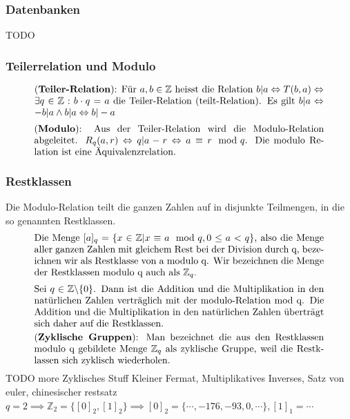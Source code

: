 \subsubsection{Datenbanken}
TODO

\subsubsection{Teilerrelation und Modulo}
\begin{equation}
    \parbox{30em}{(\textbf{Teiler-Relation}): Für \(a,b \in \mathbb{Z}\) heisst die Relation 
    \(b|a \Leftrightarrow T(b,a) \Leftrightarrow \exists q \in \mathbb{Z}: b \cdot q = a \) die Teiler-Relation (teilt-Relation).
    Es gilt \(b|a \Leftrightarrow -b|a \land b|a \Leftrightarrow b|-a\)}
\end{equation}
\begin{equation}
    \parbox{30em}{(\textbf{Modulo}): Aus der Teiler-Relation wird die Modulo-Relation abgeleitet.
    \(R_q(a,r)\Leftrightarrow q|a-r \Leftrightarrow a \equiv r \mod q \). Die modulo Relation ist eine Äquivalenzrelation.}
\end{equation}
\subsubsection{Restklassen}
Die Modulo-Relation teilt die ganzen Zahlen auf in disjunkte Teilmengen, in die so genannten Restklassen.
\begin{equation}
    \parbox{30em}{Die Menge \([a]_q = \{x  \in \mathbb{Z} | x \equiv a \mod{q}, 0 \leq a < q\}\), also die 
    Menge aller ganzen Zahlen mit gleichem Rest bei der Division durch q, bezeichnen 
    wir als Restklasse von a modulo q. Wir bezeichnen die Menge der Restklassen 
    modulo q auch als \(\mathbb{Z}_q\).}
\end{equation}
\begin{equation}
    \parbox{30em}{Sei \(q \in \mathbb{Z} \backslash \{0\}\). Dann ist die Addition und die Multiplikation in den natürlichen Zahlen verträglich mit der modulo-Relation mod q. 
    Die Addition und die Multiplikation in den natürlichen Zahlen überträgt sich daher auf die Restklassen.}
\end{equation}
\begin{equation}
    \parbox{30em}{(\textbf{Zyklische Gruppen}): Man bezeichnet die aus den Restklassen modulo q gebildete Menge \(\mathbb{Z}_q\)
    als zyklische Gruppe, weil die Restklassen sich zyklisch wiederholen.}
\end{equation}
TODO more Zyklisches Stuff
Kleiner Fermat, Multiplikatives Inverses, Satz von euler, chinesischer restsatz
\(q = 2 \implies \mathbb{Z}_2 = \{[0]_2, [1]_2\} \implies [0]_2 = \{\cdots, -176, -93, 0, \cdots\}, [1]_1 = \cdots \)
